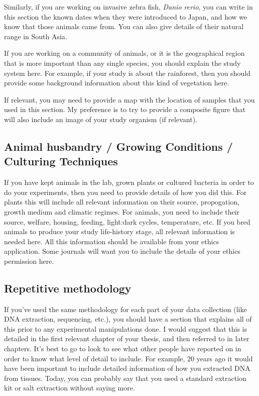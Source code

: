 \documentclass[
]{krantz}
\begin{document}
Similarly, if you are working on invasive zebra fish, \emph{Danio rerio}, you can write in this section the known dates when they were introduced to Japan, and how we know that those animals came from. You can also give details of their natural range in South Asia.

If you are working on a community of animals, or it is the geographical region that is more important than any single species, you should explain the study system here. For example, if your study is about the rainforest, then you should provide some background information about this kind of vegetation here.

If relevant, you may need to provide a map with the location of samples that you used in this section. My preference is to try to provide a composite figure that will also include an image of your study organism (if relevant).

\hypertarget{animal-husbandry-growing-conditions-culturing-techniques}{%
\subsection{Animal husbandry / Growing Conditions / Culturing Techniques}\label{animal-husbandry-growing-conditions-culturing-techniques}}

If you have kept animals in the lab, grown plants or cultured bacteria in order to do your experiments, then you need to provide details of how you did this. For plants this will include all relevant information on their source, propogation, growth medium and climatic regimes. For animals, you need to include their source, welfare, housing, feeding, light:dark cycles, temperature, etc. If you bred animals to produce your study life-history stage, all relevant information is needed here. All this information should be available from your ethics application. Some journals will want you to include the details of your ethics permission here.

\hypertarget{repetitive-methodology}{%
\subsection{Repetitive methodology}\label{repetitive-methodology}}

If you've used the same methodology for each part of your data collection (like DNA extraction, sequencing, etc.), you should have a section that explains all of this prior to any experimental manipulations done. I would suggest that this is detailed in the first relevant chapter of your thesis, and then referred to in later chapters. It's best to go to look to see what other people have reported on in order to know what level of detail to include. For example, 20 years ago it would have been important to include detailed information of how you extracted DNA from tissues. Today, you can probably say that you used a standard extraction kit or salt extraction without saying more.
\end{document}

